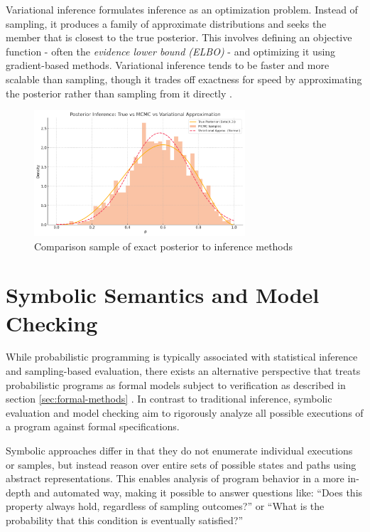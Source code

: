 Variational inference formulates inference as an optimization problem. Instead of sampling, it produces a family of approximate distributions and seeks the member that
is closest to the true posterior. This involves defining an objective function - often the \textit{evidence lower bound (ELBO)} - and optimizing it using gradient-based methods.
Variational inference tends to be faster and more scalable than sampling, though it trades off exactness for speed by approximating the posterior rather than sampling
from it directly \cite{blei2017vi}.


\begin{figure}[htbp]
  \centering
  \includegraphics[width=0.7\textwidth]{graphics/inferencePlot.png}
  \caption{Comparison sample of exact posterior to inference methods}
  \label{fig:inference_plot}
\end{figure}

\section{Symbolic Semantics and Model Checking}

While probabilistic programming is typically associated with statistical inference and sampling-based evaluation, there exists an alternative perspective
that treats probabilistic programs as formal models subject to verification \cite{2025modelcheckingprobabilisticoperator,sato2019formal} as described in section \ref{sec:formal-methods} .
In contrast to traditional inference, symbolic evaluation and model checking aim to rigorously analyze all possible executions of a program against formal specifications.

Symbolic approaches differ in that they do not enumerate individual executions or samples, but instead reason over entire sets of possible states and paths using
abstract representations. This enables analysis of program behavior in a more in-depth and automated way, making it possible to answer questions like:
“Does this property always hold, regardless of sampling outcomes?” or “What is the probability that this condition is eventually satisfied?”

